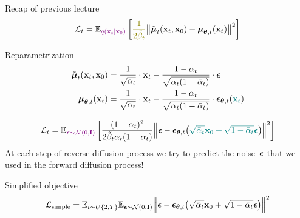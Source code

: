 \begin{frame}{Recap of previous lecture}
	\vspace{-0.3cm}
	\[
		\cL_t = \bbE_{\color{violet}q(\bx_t | \bx_0)} \left[ {\color{olive}\frac{1}{2\tilde{\beta}_t}} \bigl\| \tilde{\bmu}_t(\bx_t, \bx_0) - \bmu_{\btheta, t}(\bx_t) \bigr\|^2  \right]
	\]
	\vspace{-0.3cm}
	\begin{block}{Reparametrization}
		\vspace{-0.7cm}
		\begin{align*}
			\tilde{\boldsymbol{\mu}}_t(\mathbf{x}_t, \mathbf{x}_0) &= \frac{1}{\sqrt{\alpha_t}} \cdot \mathbf{x}_t - \frac{1 - \alpha_t}{\sqrt{\alpha_t (1 - \bar{\alpha}_t)}} \cdot \boldsymbol{\epsilon} \\
			\boldsymbol{\mu}_{\boldsymbol{\theta}, t}(\mathbf{x}_t) &= \frac{1}{\sqrt{\alpha_t}} \cdot \mathbf{x}_t - \frac{1 - \alpha_t}{\sqrt{\alpha_t (1 - \bar{\alpha}_t)}} \cdot \boldsymbol{\epsilon}_{\boldsymbol{\theta}, t}({\color{teal}\mathbf{x}_t})
		\end{align*}
		\vspace{-0.7cm}
	\end{block}
	\vspace{-0.2cm}
	\[
		\mathcal{L}_t  =	 \mathbb{E}_{\color{violet}\boldsymbol{\epsilon} \sim \mathcal{N}(0, \mathbf{I})} \left[ \frac{(1 - \alpha_t)^2}{2\tilde{\beta}_t \alpha_t (1 - \bar{\alpha}_t)} \Bigl\| \boldsymbol{\epsilon} - \boldsymbol{\epsilon}_{\boldsymbol{\theta}, t}\bigl( {\color{teal}\sqrt{\bar{\alpha}_t} \mathbf{x}_0 + \sqrt{1 - \bar{\alpha}_t} \boldsymbol{\epsilon}}\bigr) \Bigr\|^2 \right]
	\]
	At each step of reverse diffusion process we try to predict the noise~$\boldsymbol{\epsilon}$ that we used in the forward diffusion process!
	\begin{block}{Simplified objective}
		\vspace{-0.7cm}
		\[
			 \mathcal{L}_{\text{simple}} = \mathbb{E}_{t \sim U\{2, T\}} \mathbb{E}_{\boldsymbol{\epsilon} \sim \mathcal{N}(0, \mathbf{I})} \Bigl\| \boldsymbol{\epsilon} - \boldsymbol{\epsilon}_{\boldsymbol{\theta}, t}\bigl( \sqrt{\bar{\alpha}_t} \mathbf{x}_0 + \sqrt{1 - \bar{\alpha}_t} \boldsymbol{\epsilon}\bigr) \Bigr\|^2 
		\]
	\end{block}
\end{frame}
